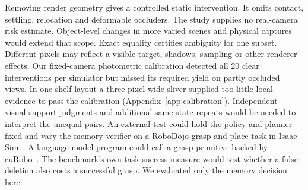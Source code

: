 \documentclass{article}
\begin{document}
Removing render geometry gives a controlled static intervention. It omits contact, settling, relocation and deformable occluders. The study supplies no real-camera risk estimate. Object-level changes in more varied scenes and physical captures would extend that scope.
Exact equality certifies ambiguity for one subset. Different pixels may reflect a visible target, shadows, sampling or other renderer effects. Our fixed-camera photometric calibration detected all 20 clear interventions per simulator but missed its required yield on partly occluded views. In one shelf layout a three-pixel-wide sliver supplied too little local evidence to pass the calibration (Appendix~\ref{app:calibration}). Independent visual-support judgments and additional same-state repeats would be needed to interpret the unequal pairs.
An external test could hold the policy and planner fixed and vary the memory verifier on a RoboDojo grasp-and-place task in Isaac Sim~\citep{robodojo}. A language-model program could call a grasp primitive backed by cuRobo~\citep{codeaspolicies,curobo}. The benchmark's own task-success measure would test whether a false deletion also costs a successful grasp. We evaluated only the memory decision here.

\clearpage
{}


\clearpage
\appendix

\end{document}
